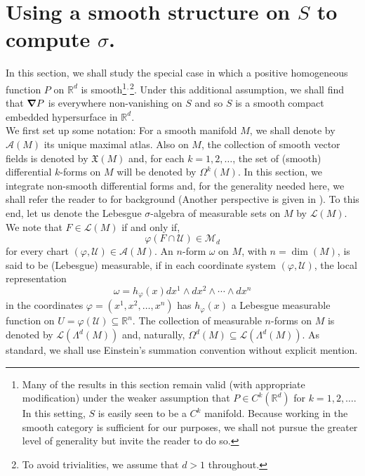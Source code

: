 \documentclass[11pt]{article}
\theoremstyle{remark}
\begin{document}
\section{Using a smooth structure on $S$ to compute $\sigma$.}\label{sec:SigmaForSmoothP}

\noindent In this section, we shall study the special case in which a positive homogeneous function $P$ on $\mathbb{R}^d$ is smooth\footnote{Many of the results in this section remain valid (with appropriate modification) under the weaker assumption that $P\in C^k(\mathbb{R}^d)$ for $k=1,2,\dots$. In this setting, $S$ is easily seen to be a $C^k$ manifold. Because working in the smooth category is sufficient for our purposes, we shall not pursue the greater level of generality but invite the reader to do so.}$^{\mbox{\tiny{,}}}$\footnote{To avoid trivialities, we assume that $d>1$ throughout.}.
Under this additional assumption, we shall find that $\grad P$ is everywhere non-vanishing on $S$ and so $S$ is a smooth compact embedded hypersurface in $\mathbb{R}^d$.\\

\noindent We first set up some notation: For a smooth manifold $M$, we shall denote by $\mathcal{A}(M)$ its unique maximal atlas. Also on $M$, the collection of smooth vector fields is denoted by $\mathfrak{X}(M)$ and, for each $k=1,2,\dots$, the set of (smooth) differential $k$-forms on $M$ will be denoted by $\Omega^k(M)$.  In this section, we integrate non-smooth differential forms and, for the generality needed here, we shall refer the reader to \cite{naber_topology_2011} for background (Another perspective is given in \cite{amann_analysis_2009}). To this end, let us denote the Lebesgue $\sigma$-algebra of measurable sets on $M$ by $\mathcal{L}(M)$. We note that $F\in\mathcal{L}(M)$ if and only if, \begin{equation*}
    \varphi(F\cap \mathcal{U})\in\mathcal{M}_d
\end{equation*}
for every chart $(\varphi,\mathcal{U})\in\mathcal{A}(M)$. An $n$-form $\omega$ on $M$, with $n=\dim(M)$, is said to be (Lebesgue) measurable, if in each coordinate system $(\varphi,\mathcal{U})$, the local representation
\begin{equation*}
    \omega=h_{\varphi}(x)dx^1\wedge dx^2\wedge \cdots\wedge dx^n
\end{equation*}
in the coordinates $\varphi=(x^1,x^2,\dots,x^n)$ has $h_{\varphi}(x)$ a Lebesgue measurable function on $U=\varphi(\mathcal{U})\subseteq\mathbb{R}^n$. The collection of measurable $n$-forms on $M$ is denoted by $\mathcal{L}(\Lambda^d(M))$ and, naturally, $\Omega^{d}(M)\subseteq \mathcal{L}(\Lambda^d(M))$. As standard, we shall use Einstein's summation convention without explicit mention.\\
\end{document}

